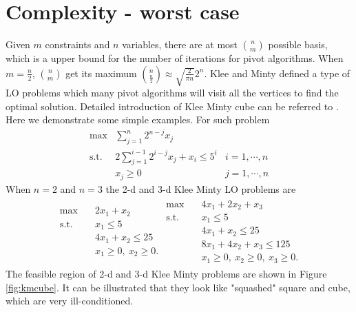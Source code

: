 \documentclass[11pt]{article}
\begin{document}
\section{Complexity - worst case}
Given $m$ constraints and $n$ variables, there are at most $\binom{n}{m}$ possible basis, which is a upper bound for the number of iterations for pivot algorithms. When $m=\frac{n}{2}$, $\binom{n}{m}$ get its maximum $\binom{n}{\frac{n}{2}}\approx \sqrt{\frac{2}{\pi n}}2^n$. Klee and Minty defined a type of LO problems which many pivot algorithms will visit all the vertices to find the optimal solution. Detailed introduction of Klee Minty cube can be referred to \cite{vanderbei2020linear}. Here we demonstrate some simple examples. For such problem
\begin{align*}
\max &\sum_{j=1}^n 2^{n-j}x_j\\
\text{s.t. } &2\sum_{j=1}^{i-1}2^{i-j}x_j + x_i \le 5^i &i=1,\cdots,n\\ 
			&x_j \ge 0 & j=1,\cdots,n
\end{align*} 
When $n=2$ and $n=3$ the 2-d and 3-d Klee Minty LO problems are 
\begin{align*}
\begin{split}
\max \quad & 2x_1 + x_2 \\
\text{s.t. }\quad  & x_1 \le 5\\
& 4x_1 + x_2 \le 25\\
& x_1 \ge 0,\ x_2 \ge 0.
\end{split}
\begin{split}
\max \quad & 4x_1 + 2x_2 + x_3 \\
\text{s.t. }\quad  & x_1 \le 5\\
& 4x_1 + x_2 \le 25\\
& 8x_1 + 4x_2 + x_3 \le 125\\
& x_1 \ge 0,\ x_2 \ge 0, \ x_3 \ge 0.
\end{split}
\end{align*}
The feasible region of 2-d and 3-d Klee Minty problems are shown in Figure \ref{fig:kmcube}. It can be illustrated that they look like "squashed" square and cube, which are very ill-conditioned.
\end{document}
